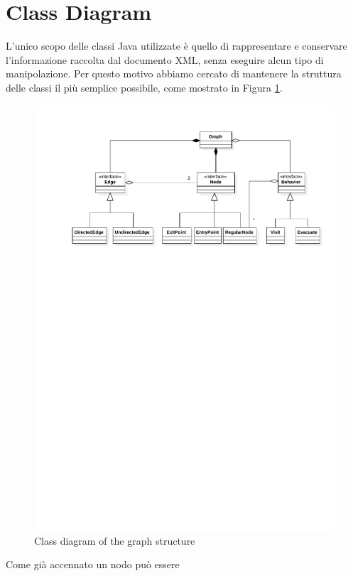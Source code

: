\section{Class Diagram}
L'unico scopo delle classi Java utilizzate è quello di rappresentare e conservare l'informazione raccolta dal documento XML, senza eseguire alcun tipo di manipolazione. Per questo motivo abbiamo cercato di mantenere la struttura delle classi il più semplice possibile, come mostrato in Figura \ref{fig:graph-diagram}.\\
\begin{figure}[htbp]
\centering
\includegraphics[width=\textwidth,height=\textheight,keepaspectratio]{images/graph-diagram.pdf}
\caption{Class diagram of the graph structure}
\label{fig:graph-diagram}
\end{figure}
Come già accennato un nodo può essere 